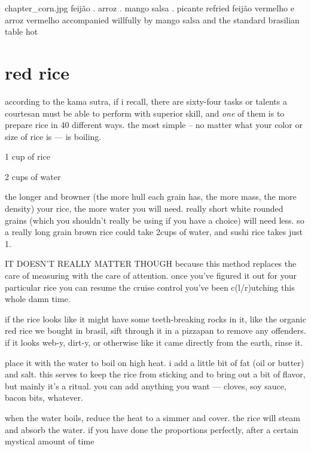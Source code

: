 \mychapter
{chapter_corn.jpg}
{feij\~{a}o . arroz . mango salsa . picante}
{refried feij\~{a}o vermelho e arroz vermelho accompanied willfully by
mango salsa and the standard brasilian table hot}
\label{chap:feijao}

\section{red rice}

according to the kama sutra, if i recall, there are sixty-four tasks
or talents a courtesan must be able to perform with superior skill,
and \textit{one} of them is to prepare rice in 40 different ways. the
most simple -- no matter what your color or size of rice is --- is
boiling.

\begin{ingredients}
  \item 1 cup of rice
  \item 2 cups of water
\end{ingredients}

the longer and browner (the more hull each grain has, the more mass,
the more density) your rice, the more water you will need. really
short white rounded grains (which you shouldn't really be using if you
have a choice) will need less. so a really long grain brown rice could
take 2\onehalf cups of water, and sushi rice takes just 1\onehalf.

IT DOESN'T REALLY MATTER THOUGH because this method replaces the care
of measuring with the care of attention. once you've figured it out
for your particular rice you can resume the cruise control you've been
c(l/r)utching this whole damn time.

if the rice looks like it might have some teeth-breaking rocks in it,
like the organic red rice we bought in brasil, sift through it in a
pizzapan to remove any offenders. if it looks web-y, dirt-y, or
otherwise like it came directly from the earth, rinse it.

place it with the water to boil on high heat. i add a little bit of
fat (oil or butter) and salt. this serves to keep the rice from
sticking and to bring out a bit of flavor, but mainly it's a
ritual. you can add anything you want --- cloves, soy sauce, bacon
bits, whatever.

when the water boils, reduce the heat to a simmer and cover. the rice
will steam and absorb the water. if you have done the proportions
perfectly, after a certain mystical amount of time

